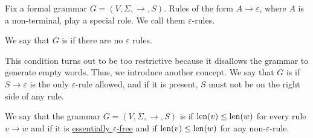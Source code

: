 \begin{definition}\label{def:epsilon_free_grammar}\mimprovised
  Fix a formal grammar \( G = (V, \Sigma, \to, S) \). Rules of the form \( A \to \varepsilon \), where \( A \) is a non-terminal, play a special role. We call them \( \varepsilon \)-rules.

  We say that \( G \) is  if there are no \( \varepsilon \) rules.

  This condition turns out to be too restrictive because it disallows the grammar to generate empty words. Thus, we introduce another concept. We say that \( G \) is  if \( S \to \varepsilon \) is the only \( \varepsilon \)-rule allowed, and if it is present, \( S \) must not be on the right side of any rule.
\end{definition}

\begin{definition}\label{def:length_increasing_grammar}
  We say that the grammar \( G = (V, \Sigma, \to, S) \) is  if \( \operatorname{len}(v) \leq \operatorname{len}(w) \) for every rule \( v \to w \) and  if it is \hyperref[def:epsilon_free_grammar]{essentially \( \varepsilon \)-free} and if \( \operatorname{len}(v) \leq \operatorname{len}(w) \) for any non-\( \varepsilon \)-rule.
\end{definition}

